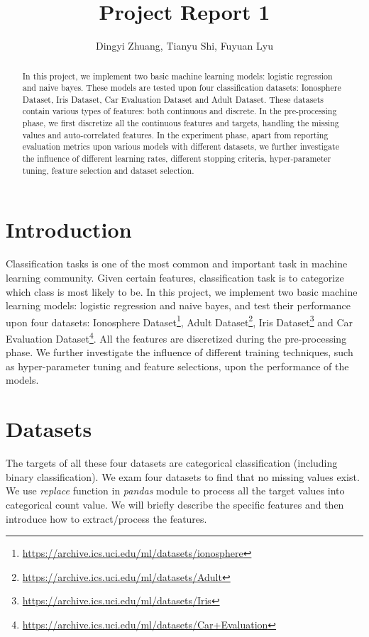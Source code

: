 \documentclass[11pt]{scrartcl}
\title{Project Report 1}
\author{Dingyi Zhuang, Tianyu Shi, Fuyuan Lyu}
\begin{document}
\maketitle

\begin{abstract}
In this project, we implement two basic machine learning models: logistic regression and naive bayes. These models are tested upon four classification datasets: Ionosphere Dataset, Iris Dataset, Car Evaluation Dataset and Adult Dataset. These datasets contain various types of features: both continuous and discrete. In the pre-processing phase, we first discretize all the continuous features and targets, handling the missing values and auto-correlated features. In the experiment phase, apart from reporting evaluation metrics upon various models with different datasets, we further investigate the influence of different learning rates, different stopping criteria, hyper-parameter tuning, feature selection and dataset selection.

\end{abstract}

\section{Introduction}
Classification tasks is one of the most common and important task in machine learning community. Given certain features, classification task is to categorize which class is most likely to be. In this project, we implement two basic machine learning models: logistic regression and naive bayes, and test their performance upon four datasets: Ionosphere Dataset\footnote{\url{https://archive.ics.uci.edu/ml/datasets/ionosphere}}, Adult Dataset\footnote{\url{https://archive.ics.uci.edu/ml/datasets/Adult}}, Iris Dataset\footnote{\url{https://archive.ics.uci.edu/ml/datasets/Iris}} and Car Evaluation Dataset\footnote{\url{https://archive.ics.uci.edu/ml/datasets/Car+Evaluation}}. All the features are discretized during the pre-processing phase. We further investigate the influence of different training techniques, such as hyper-parameter tuning and feature selections, upon the performance of the models.

\section{Datasets}
The targets of all these four datasets are categorical classification (including binary classification). We exam four datasets to find that no missing values exist. We use \textit{replace} function in \textit{pandas} module to process all the target values into categorical count value. We will briefly describe the specific features and then introduce how to extract/process the features.
\end{document}

